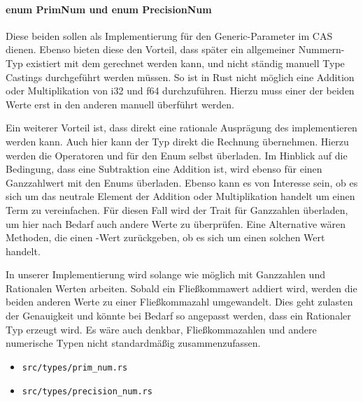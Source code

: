 \documentclass[11pt,a4paper, ngerman]{article}
\begin{document}
\paragraph{enum PrimNum und enum PrecisionNum} Diese beiden  sollen als Implementierung für den Generic-Parameter im CAS dienen. Ebenso bieten diese den Vorteil, dass später ein allgemeiner Nummern-Typ existiert mit dem gerechnet werden kann, und nicht ständig manuell Type Castings durchgeführt werden müssen. So ist in Rust nicht möglich eine Addition oder Multiplikation von i32 und f64 durchzuführen. Hierzu muss einer der beiden Werte erst in den anderen manuell überführt werden.

Ein weiterer Vorteil ist, dass direkt eine rationale Ausprägung des  implementieren werden kann. Auch hier kann der Typ direkt die Rechnung übernehmen. Hierzu werden die Operatoren  und  für den Enum selbst überladen. Im Hinblick auf die Bedingung, dass eine Subtraktion eine Addition ist, wird ebenso  für einen Ganzzahlwert mit den Enums überladen. Ebenso kann es von Interesse sein, ob es sich um das neutrale Element der Addition oder Multiplikation handelt um einen Term zu vereinfachen. Für diesen Fall wird der Trait  für Ganzzahlen überladen, um hier nach Bedarf auch andere Werte zu überprüfen. Eine Alternative wären Methoden, die einen -Wert zurückgeben, ob es sich um einen solchen Wert handelt.

In unserer Implementierung wird  solange wie möglich mit Ganzzahlen und Rationalen Werten arbeiten. Sobald ein Fließkommawert addiert wird, werden die beiden anderen Werte zu einer Fließkommazahl umgewandelt. Dies geht zulasten der Genauigkeit und könnte bei Bedarf so angepasst werden, dass ein Rationaler Typ erzeugt wird. Es wäre auch denkbar, Fließkommazahlen und andere numerische Typen nicht standardmäßig zusammenzufassen.

\begin{itemize}
    \item \begin{verbatim}src/types/prim_num.rs\end{verbatim}
    \item \begin{verbatim}src/types/precision_num.rs\end{verbatim}
\end{itemize}
\end{document}
